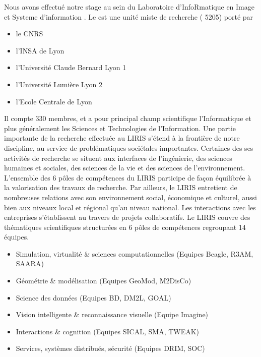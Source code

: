 Nous avons effectué notre stage au sein du Laboratoire d'InfoRmatique en 
Image et Systeme d'information .
Le est une unité miste de recherche  ( 5205) porté par
\begin{itemize}
  \item le CNRS
  \item l'INSA de Lyon
  \item l'Université Claude Bernard Lyon 1
  \item l'Université Lumière Lyon 2
  \item l'Ecole Centrale de Lyon
\end{itemize}
Il compte 330 membres, et a pour principal champ scientifique 
l'Informatique et plus généralement les Sciences et Technologies de l’Information.
Une partie importante de la recherche effectuée au LIRIS s’étend à la frontière de notre 
discipline, au service de problématiques sociétales importantes. Certaines des ses activités de 
recherche se situent aux interfaces de l’ingénierie, des sciences humaines et sociales, des sciences 
de la vie et des sciences de l’environnement. L’ensemble des 6 pôles de compétences du LIRIS participe 
de façon équilibrée à la valorisation des travaux de recherche. Par ailleurs, le LIRIS entretient de 
nombreuses relations avec son environnement social, économique et culturel, aussi bien aux niveaux 
local et régional qu’au niveau  national. 
Les interactions avec les entreprises s’établissent au travers de projets collaboratifs.
Le LIRIS couvre des thématiques scientifiques structurées en 6 pôles de compétences regroupant 14 équipes. 
\begin{itemize}
  \item Simulation, virtualité \& sciences computationnelles (Equipes Beagle, R3AM, SAARA)
  \item Géométrie \& modélisation (Equipes GeoMod, M2DisCo)
  \item Science des données (Equipes BD, DM2L, GOAL)
  \item Vision intelligente \& reconnaissance visuelle (Equipe Imagine)
  \item Interactions \& cognition (Equipes SICAL, SMA, TWEAK)
  \item Services, systèmes distribués, sécurité (Equipes DRIM, SOC)
\end{itemize}


